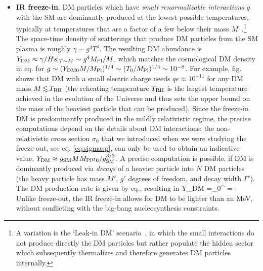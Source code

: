 \begin{itemize}
\item[$\blacktriangledown$]
{\bf IR freeze-in}.
DM particles which have {\em small renormalizable interactions} $g$ with the SM
are dominantly produced at the lowest possible
temperatures, typically at temperatures that are a factor of a few below their mass $M$~\cite{freeze-in}.\footnote{A variation is the `Leak-in DM' scenario~\cite{Evans:2019vxr}, in which the small interactions do not produce directly the DM particles but rather populate the hidden sector which subsequently thermalizes and therefore generates DM particles internally.}
The space-time density of scatterings that produce DM particles from the SM plasma is
roughly $\gamma \sim g^4 T^4$.
The resulting DM abundance is $Y_{\rm DM}  \approx \gamma/Hs|_{T\sim M} \sim g^4 M_{\rm Pl}/M$, 
which matches the cosmological DM density in eq.
for $g \sim (Y_{{\rm DM}0} M/M_{\rm Pl})^{1/4}\sim (T_0/M_{\rm Pl})^{1/4}\sim 10^{-8}$.
For example, fig. shows that 
DM with a small electric charge needs $qe \approx 10^{-11}$ for any DM mass $M \circa{<}T_{\rm RH}$ 
(the reheating temperature $T_{\rm RH}$ is the largest temperature achieved in the evolution of the Universe and thus sets the upper bound on the mass of the heaviest particle that can be produced).
Since the freeze-in DM is predominantly produced in the mildly relativistic regime,
the precise computations depend on the details about DM  interactions:
the non-relativistic cross section $\sigma_0$  that we introduced when we were studying the freeze-out, see eq. \eqref{eq:sigmasp},
can only be used to obtain an indicative value,
$Y_{\rm DM} \approx g_{\rm SM} M M_{\rm Pl} \sigma_0/g_{\rm SM}^{3/2}$.
A precise computation is possible, if DM is dominantly produced via {\em decays} of a heavier
particle into $N$ DM particles (the heavy particle has mass $M'$, $g'$ degrees of freedom, and decay width $\Gamma'$).
The DM production rate is given by eq., resulting in
\beq \label{eq:decayfreezein}
Y_{\rm DM} =\int_0^\infty {}   = 
.\eeq
Unlike freeze-out, the IR freeze-in allows for DM to be lighter than an MeV, without conflicting with the big-bang nucleosynthesis constraints. 




\end{itemize}
